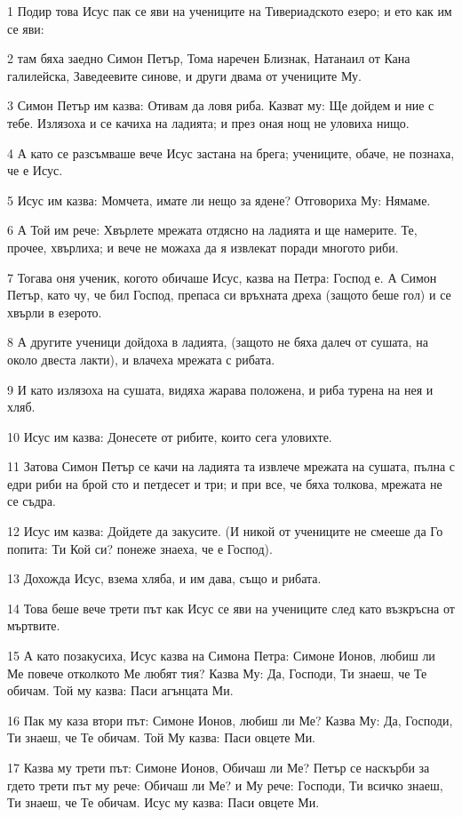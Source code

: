 \par 1 Подир това Исус пак се яви на учениците на Тивериадското езеро; и ето как им се яви:
\par 2 там бяха заедно Симон Петър, Тома наречен Близнак, Натанаил от Кана галилейска, Заведеевите синове, и други двама от учениците Му.
\par 3 Симон Петър им казва: Отивам да ловя риба. Казват му: Ще дойдем и ние с тебе. Излязоха и се качиха на ладията; и през оная нощ не уловиха нищо.
\par 4 А като се разсъмваше вече Исус застана на брега; учениците, обаче, не познаха, че е Исус.
\par 5 Исус им казва: Момчета, имате ли нещо за ядене? Отговориха Му: Нямаме.
\par 6 А Той им рече: Хвърлете мрежата отдясно на ладията и ще намерите. Те, прочее, хвърлиха; и вече не можаха да я извлекат поради многото риби.
\par 7 Тогава оня ученик, когото обичаше Исус, казва на Петра: Господ е. А Симон Петър, като чу, че бил Господ, препаса си връхната дреха (защото беше гол) и се хвърли в езерото.
\par 8 А другите ученици дойдоха в ладията, (защото не бяха далеч от сушата, на около двеста лакти), и влачеха мрежата с рибата.
\par 9 И като излязоха на сушата, видяха жарава положена, и риба турена на нея и хляб.
\par 10 Исус им казва: Донесете от рибите, които сега уловихте.
\par 11 Затова Симон Петър се качи на ладията та извлече мрежата на сушата, пълна с едри риби на брой сто и петдесет и три; и при все, че бяха толкова, мрежата не се съдра.
\par 12 Исус им казва: Дойдете да закусите. (И никой от учениците не смееше да Го попита: Ти Кой си? понеже знаеха, че е Господ).
\par 13 Дохожда Исус, взема хляба, и им дава, също и рибата.
\par 14 Това беше вече трети път как Исус се яви на учениците след като възкръсна от мъртвите.
\par 15 А като позакусиха, Исус казва на Симона Петра: Симоне Ионов, любиш ли Ме повече отколкото Ме любят тия? Казва Му: Да, Господи, Ти знаеш, че Те обичам. Той му казва: Паси агънцата Ми.
\par 16 Пак му каза втори път: Симоне Ионов, любиш ли Ме? Казва Му: Да, Господи, Ти знаеш, че Те обичам. Той Му казва: Паси овцете Ми.
\par 17 Казва му трети път: Симоне Ионов, Обичаш ли Ме? Петър се наскърби за гдето трети път му рече: Обичаш ли Ме? и Му рече: Господи, Ти всичко знаеш, Ти знаеш, че Те обичам. Исус му казва: Паси овцете Ми.
